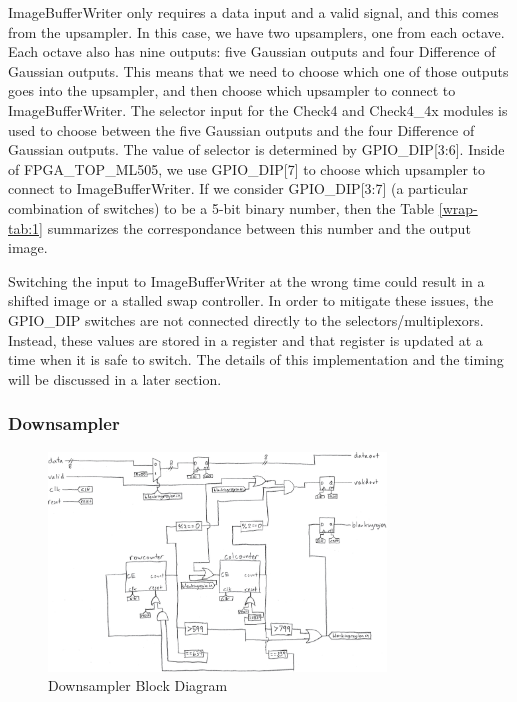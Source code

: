ImageBufferWriter only requires a data input and a valid signal, and this comes 
from the upsampler. In this case, we have two upsamplers, one from each octave. 
Each octave also has nine outputs: five Gaussian outputs and four Difference of 
Gaussian outputs. This means that we need to choose which one of those outputs 
goes into the upsampler, and then choose which upsampler to connect to 
ImageBufferWriter. The selector input for the Check4 and Check4\_4x modules is 
used to choose between the five Gaussian outputs and the four Difference of 
Gaussian outputs. The value of selector is determined by GPIO\_DIP[3:6]. Inside 
of FPGA\_TOP\_ML505, we use GPIO\_DIP[7] to choose which upsampler to connect to 
ImageBufferWriter. If we consider GPIO\_DIP[3:7] (a particular combination of 
switches) to be a 5-bit binary number, then the Table \ref{wrap-tab:1} summarizes the
correspondance between this number and the output image.


Switching the input to ImageBufferWriter at the wrong time could result in 
a shifted image or a stalled swap controller. In order to mitigate these issues, 
the GPIO\_DIP switches are not connected directly to the selectors/multiplexors. 
Instead, these values are stored in a register and that register is updated at 
a time when it is safe to switch. The details of this implementation and the 
timing will be discussed in a later section.


\subsubsection{Downsampler}

\begin{figure}
    \centering
    \includegraphics[width=0.8\textwidth]{processed_image_pngs/Downsampler.png}
    \caption{Downsampler Block Diagram}
    \label{fig:downsampler}
\end{figure}


